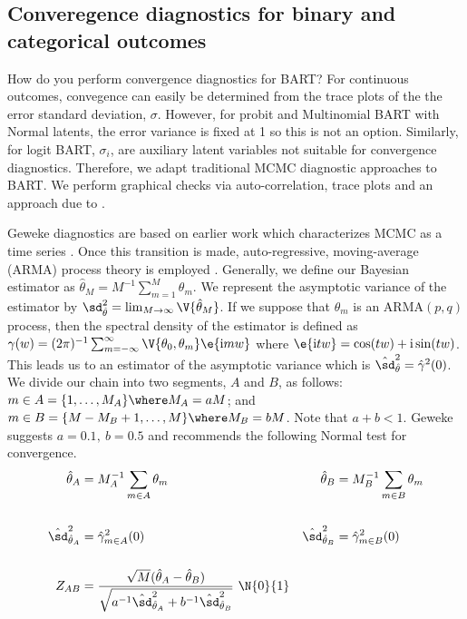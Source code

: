 \documentclass[article]{jss}
\begin{document}
\subsection{Converegence diagnostics for binary and categorical outcomes}\label{geweke}

How do you perform convergence diagnostics for BART?  For continuous
outcomes, convegence can easily be determined from the trace plots of
the the error standard deviation, $\sigma$.  However, for probit and
Multinomial BART with Normal latents, the error variance is fixed at 1
so this is not an option.  Similarly, for logit BART, $\sigma_i$, are
auxiliary latent variables not suitable for convergence diagnostics.
Therefore, we adapt traditional MCMC diagnostic approaches to BART.
We perform graphical checks via auto-correlation, trace plots and an
approach due to \cite{Gewe92}.

Geweke diagnostics are based on earlier work which characterizes
MCMC as a time series \citep{Hast70}.  Once this transition is
made, auto-regressive, moving-average (ARMA) process theory is
employed \citep{Silv86}.  Generally, we define our Bayesian estimator
as $\hat\theta_M = M^{-1}\sum_{m=1}^M \theta_m$.  We represent the
asymptotic variance of the estimator by
$ \sd^2_{\hat\theta} =\lim_{M \rightarrow \infty} \V{\hat\theta_M}$.
If we suppose that $\theta_m$ is an $\mathrm{ARMA}(p, q)$ process, then the
spectral density of the estimator is defined as
$\gamma(w) = (2\pi)^{-1} \sum_{m=-\infty}^{\infty} \V{\theta_0,
  \theta_m} \e{\mathrm{i} m w}$
where $\e{\mathrm{i} t w}=\cos(t w)+\mathrm{i} \sin(t w)$.  This
leads us to an estimator of the asymptotic variance which is
$\hat\sd^2_{\hat\theta} = {\hat{\gamma}^2(0)}$.
We divide our chain into two segments, $A$ and $B$, as follows:
$m \in A=\{1, \dots, M_A\} \where M_A= a M$; and
$m \in B=\{M-M_B+1, \dots, M\} \where M_B= b M$.  Note that 
$a+b<1$. Geweke suggests $a=0.1,\ b=0.5$ and recommends the
following Normal test for convergence.
\begin{align*}
\hat\theta_A & = M_A^{-1}\sum_{m \in A} \theta_m  &
\hat\theta_B & = M_B^{-1}\sum_{m \in B} \theta_m  \\
& \\
\hat\sd^2_{\hat\theta_A} & = \hat{\gamma}_{m \in A}^2(0) &
\hat\sd^2_{\hat\theta_B} & = \hat{\gamma}_{m \in B}^2(0) \\
& \\
Z_{AB} & = \frac{\sqrt{M}(\hat\theta_A-\hat\theta_B)}
{\sqrt{a^{-1}\hat\sd^2_{\hat\theta_A}+b^{-1}\hat\sd^2_{\hat\theta_B}}}~{\N{0}{1}}
\end{align*}
\end{document}
